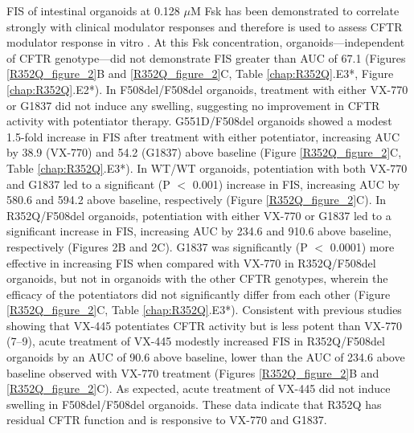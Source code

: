 FIS of intestinal organoids at 0.128 $\mu$M Fsk has been demonstrated to correlate strongly with clinical modulator responses and therefore is used to assess CFTR modulator response in vitro \cite{dekkers2016}. At this Fsk concentration, organoids—independent of CFTR genotype—did not demonstrate FIS greater than AUC of 67.1 (Figures \ref{R352Q_figure_2}B and \ref{R352Q_figure_2}C, Table \ref{chap:R352Q}.E3*, Figure \ref{chap:R352Q}.E2*). In F508del/F508del organoids, treatment with either VX-770 or G1837 did not induce any swelling, suggesting no improvement in CFTR activity with potentiator therapy. G551D/F508del organoids showed a modest 1.5-fold increase in FIS after treatment with either potentiator, increasing AUC by 38.9 (VX-770) and 54.2 (G1837) above baseline (Figure \ref{R352Q_figure_2}C, Table \ref{chap:R352Q}.E3*). In WT/WT organoids, potentiation with both VX-770 and G1837 led to a significant (P $<$ 0.001) increase in FIS, increasing AUC by 580.6 and 594.2 above baseline, respectively (Figure \ref{R352Q_figure_2}C). In R352Q/F508del organoids, potentiation with either VX-770 or G1837 led to a significant increase in FIS, increasing AUC by 234.6 and 910.6 above baseline, respectively (Figures 2B and 2C). G1837 was significantly (P $<$ 0.0001) more effective in increasing FIS when compared with VX-770 in R352Q/F508del organoids, but not in organoids with the other CFTR genotypes, wherein the efficacy of the potentiators did not significantly differ from each other (Figure \ref{R352Q_figure_2}C, Table \ref{chap:R352Q}.E3*). Consistent with previous studies showing that VX-445 potentiates CFTR activity but is less potent than VX-770 (7–9), acute treatment of VX-445 modestly increased FIS in R352Q/F508del organoids by an AUC of 90.6 above baseline, lower than the AUC of 234.6 above baseline observed with VX-770 treatment (Figures \ref{R352Q_figure_2}B and \ref{R352Q_figure_2}C). As expected, acute treatment of VX-445 did not induce swelling in F508del/F508del organoids. These data indicate that R352Q has residual CFTR function and is responsive to VX-770 and G1837.

